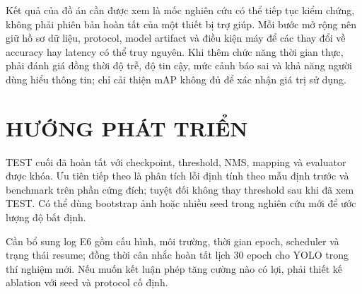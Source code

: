 \documentclass[12pt,a4paper,oneside]{report}
\begin{document}
Kết quả của đồ án cần được xem là mốc nghiên cứu có thể tiếp tục kiểm chứng, không phải phiên bản hoàn tất của một thiết bị trợ giúp. Mỗi bước mở rộng nên giữ hồ sơ dữ liệu, protocol, model artifact và điều kiện máy để các thay đổi về accuracy hay latency có thể truy nguyên. Khi thêm chức năng thời gian thực, phải đánh giá đồng thời độ trễ, độ tin cậy, mức cảnh báo sai và khả năng người dùng hiểu thông tin; chỉ cải thiện mAP không đủ để xác nhận giá trị sử dụng.

\chapter*{HƯỚNG PHÁT TRIỂN}
TEST cuối đã hoàn tất với checkpoint, threshold, NMS, mapping và evaluator được khóa. Ưu tiên tiếp theo là phân tích lỗi định tính theo mẫu định trước và benchmark trên phần cứng đích; tuyệt đối không thay threshold sau khi đã xem TEST. Có thể dùng bootstrap ảnh hoặc nhiều seed trong nghiên cứu mới để ước lượng độ bất định.

Cần bổ sung log E6 gồm cấu hình, môi trường, thời gian epoch, scheduler và trạng thái resume; đồng thời cân nhắc hoàn tất lịch 30 epoch cho YOLO trong thí nghiệm mới. Nếu muốn kết luận phép tăng cường nào có lợi, phải thiết kế ablation với seed và protocol cố định.
\end{document}
